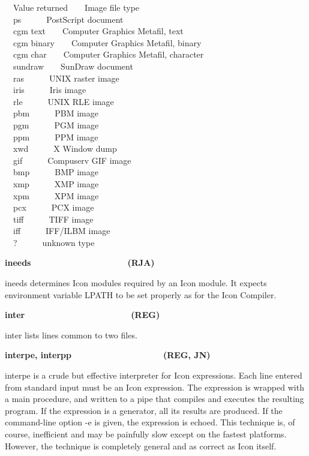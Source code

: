 \ \ Value returned\ \ \ \ Image file type\\
\ \ ps\ \ \ \ \ \ PostScript document\\
\ \ cgm text\ \ \ \ Computer Graphics Metafil, text\\
\ \ cgm binary\ \ \ \ Computer Graphics Metafil, binary\\
\ \ cgm char\ \ \ \ Computer Graphics Metafil, character\\
\ \ sundraw\ \ \ \ SunDraw document\\
\ \ ras\ \ \ \ \ \ UNIX raster image\\
\ \ iris\ \ \ \ \ \ Iris image\\
\ \ rle\ \ \ \ \ \ UNIX RLE image\\
\ \ pbm\ \ \ \ \ \ PBM image\\
\ \ pgm\ \ \ \ \ \ PGM image\\
\ \ ppm\ \ \ \ \ \ PPM image\\
\ \ xwd\ \ \ \ \ \ X Window dump\\
\ \ gif\ \ \ \ \ \ Compuserv GIF image\\
\ \ bmp\ \ \ \ \ \ BMP image\\
\ \ xmp\ \ \ \ \ \ XMP image\\
\ \ xpm\ \ \ \ \ \ XPM image\\
\ \ pcx\ \ \ \ \ \ PCX image\\
\ \ tiff\ \ \ \ \ \ TIFF image\\
\ \ iff\ \ \ \ \ \ IFF/ILBM image\\
\ \ ?\ \ \ \ \ \ unknown type

{\sffamily\bfseries
ineeds\ \ \ \ \ \ \ \ \ \ \ \ \ \ \ \ \ \ \ \ (RJA)}

\textsf{ineeds} determines Icon modules required by an Icon module. It
expects environment variable LPATH to be set properly as for the Icon
Compiler.

{\sffamily\bfseries
inter\ \ \ \ \ \ \ \ \ \ \ \ \ \ \ \ \ \ \ \ \ \ (REG)}

\textsf{inter} lists lines common to two files. 

{\sffamily\bfseries
interpe, interpp\ \ \ \ \ \ \ \ \ \ \ \ \ \ \ \  \ \ \ (REG, JN)}

\textsf{interpe} is a crude but effective interpreter for Icon
expressions. Each line entered from standard input must be an Icon
expression. The expression is wrapped with a main procedure, and
written to a pipe that compiles and executes the resulting program. If
the expression is a generator, all its results are
produced. If the command-line option -e is given, the expression is
echoed. This technique is, of course, inefficient and may be painfully
slow except on the fastest platforms. However, the technique is
completely general and as correct as Icon itself.

